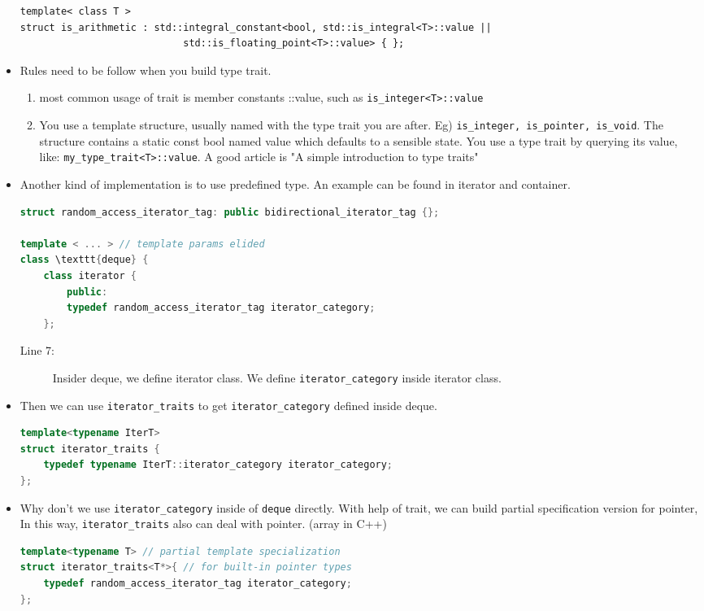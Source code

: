 \documentclass[a4paper,11pt,twoside]{book}
\begin{document}
\begin{itemize}
\begin{lstlisting}[numbers=none]
template< class T >
struct is_arithmetic : std::integral_constant<bool, std::is_integral<T>::value ||
							std::is_floating_point<T>::value> { };
\end{lstlisting}

	\item Rules need to be follow when you build type trait.
	
	\begin{enumerate}
		\item most common usage of trait is member constants ::value, such as \texttt{is\_integer<T>::value}
		
		\item You use a template structure, usually named with the type trait you are after. Eg) \texttt{is\_integer, is\_pointer, is\_void}. The structure contains a static const bool named value which defaults to a sensible state. You use a type trait by querying its value, like: \texttt{my\_type\_trait<T>::value}. A good article is "A simple introduction to type traits"
	\end{enumerate}

	\item Another kind of implementation is to use predefined type. An example can be found in iterator and container.

\begin{lstlisting}[frame=single, language=c++]
struct random_access_iterator_tag: public bidirectional_iterator_tag {};

template < ... > // template params elided
class \texttt{deque} {
	class iterator {
		public:
		typedef random_access_iterator_tag iterator_category;
	};		
\end{lstlisting}
\begin{description}
	\item[Line 7:] Insider deque, we define iterator class. We define \texttt{iterator\_category} inside iterator class. 
\end{description}

	\item Then we can use \texttt{iterator\_traits} to get \texttt{iterator\_category} defined inside deque.
\begin{lstlisting}[frame=single, language=c++]
template<typename IterT>
struct iterator_traits {
	typedef typename IterT::iterator_category iterator_category;
};
\end{lstlisting}

	\item Why don't we use \texttt{iterator\_category} inside of \texttt{deque} directly. With help of trait, we can build partial specification version for pointer, In this way, \texttt{iterator\_traits} also can deal with pointer. (array in C++)
\begin{lstlisting}[frame=single, language=c++]
template<typename T> // partial template specialization
struct iterator_traits<T*>{ // for built-in pointer types
	typedef random_access_iterator_tag iterator_category;
};
\end{lstlisting}


\end{itemize}
\end{document}
